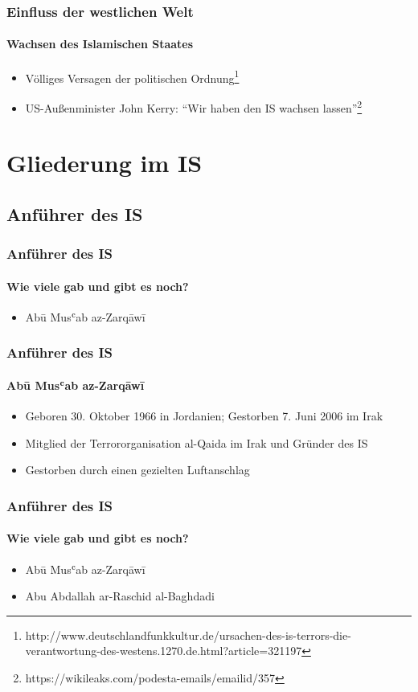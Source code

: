 \documentclass[10pt,a4paper]{beamer}
\newcommand{\ftn}[2]{\footnote[#1]{\tiny #2}}
\begin{document}
\begin{frame}
\frametitle{Einfluss der westlichen Welt}
\framesubtitle{Wachsen des Islamischen Staates}
\begin{itemize}
\item Völliges Versagen der politischen Ordnung\ftn{3}{http://www.deutschlandfunkkultur.de/ursachen-des-is-terrors-die-verantwortung-des-westens.1270.de.html?article=321197}
\pause  
\item US-Außenminister John Kerry: \enquote{Wir haben den IS wachsen lassen}\ftn{4}{https://wikileaks.com/podesta-emails/emailid/357}
\end{itemize}
\end{frame}

\section{Gliederung im IS}
\subsection{Anführer des IS}
\begin{frame}
\frametitle{Anführer des IS}
\framesubtitle{Wie viele gab und gibt es noch?}
\begin{itemize}
	\item Abū Musʿab az-Zarqāwī
\end{itemize}
\end{frame}

\begin{frame}
\frametitle{Anführer des IS}
\framesubtitle{Abū Musʿab az-Zarqāwī}
\begin{itemize}
	\item Geboren 30. Oktober 1966 in Jordanien; Gestorben 7. Juni 2006 im Irak \pause
	\item Mitglied der Terrororganisation al-Qaida im Irak und Gründer des IS
	\pause
	\item Gestorben durch einen gezielten Luftanschlag
\end{itemize}
\end{frame}

\begin{frame}
\frametitle{Anführer des IS}
\framesubtitle{Wie viele gab und gibt es noch?}
\begin{itemize}
	\item Abū Musʿab az-Zarqāwī
	\item Abu Abdallah ar-Raschid al-Baghdadi
\end{itemize}
\end{frame}
\end{document}
